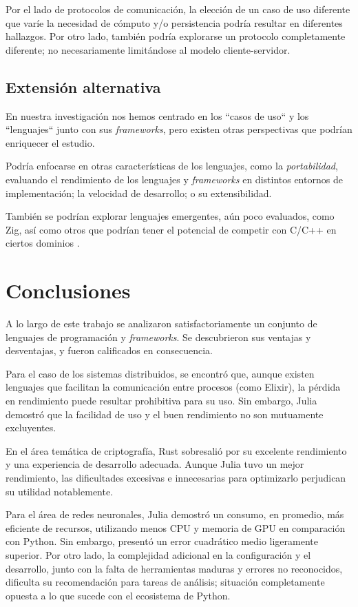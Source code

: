 \documentclass[11pt]{article}
\let\Oldsection\section
\renewcommand{\section}{\FloatBarrier\Oldsection}
\let\Oldsubsection\subsection
\renewcommand{\subsection}{\FloatBarrier\Oldsubsection}
\newcommand{\english}[1]{\textit{#1}}
\begin{document}
Por el lado de protocolos de comunicación, la elección de un caso de uso diferente que varíe la necesidad de cómputo y/o persistencia podría resultar en diferentes hallazgos. Por otro lado, también podría explorarse un protocolo completamente diferente; no necesariamente limitándose al modelo cliente-servidor.

\subsection{Extensión alternativa}

En nuestra investigación nos hemos centrado en los ``casos de uso`` y los ``lenguajes`` junto con sus \english{frameworks}, pero existen otras perspectivas que podrían enriquecer el estudio.

Podría enfocarse en otras características de los lenguajes, como la \textit{portabilidad}, evaluando el rendimiento de los lenguajes y \english{frameworks} en distintos entornos de implementación; la velocidad de desarrollo; o su extensibilidad.

También se podrían explorar lenguajes emergentes, aún poco evaluados, como Zig, así como otros que podrían tener el potencial de competir con C/C++ en ciertos dominios \cite{cpp_killers}.

\section{Conclusiones}

A lo largo de este trabajo se analizaron satisfactoriamente un conjunto de lenguajes de programación y \textit{frameworks}. Se descubrieron sus ventajas y desventajas, y fueron calificados en consecuencia.

Para el caso de los sistemas distribuidos, se encontró que, aunque existen lenguajes que facilitan la comunicación entre procesos (como Elixir), la pérdida en rendimiento puede resultar prohibitiva para su uso. Sin embargo, Julia demostró que la facilidad de uso y el buen rendimiento no son mutuamente excluyentes.

En el área temática de criptografía, Rust sobresalió por su excelente rendimiento y una experiencia de desarrollo adecuada. Aunque Julia tuvo un mejor rendimiento, las dificultades excesivas e innecesarias para optimizarlo perjudican su utilidad notablemente.

Para el área de redes neuronales, Julia demostró un consumo, en promedio, más eficiente de recursos, utilizando menos CPU y memoria de GPU en comparación con Python. Sin embargo, presentó un error cuadrático medio ligeramente superior. Por otro lado, la complejidad adicional en la configuración y el desarrollo, junto con la falta de herramientas maduras y errores no reconocidos, dificulta su recomendación para tareas de análisis; situación completamente opuesta a lo que sucede con el ecosistema de Python.
\end{document}
